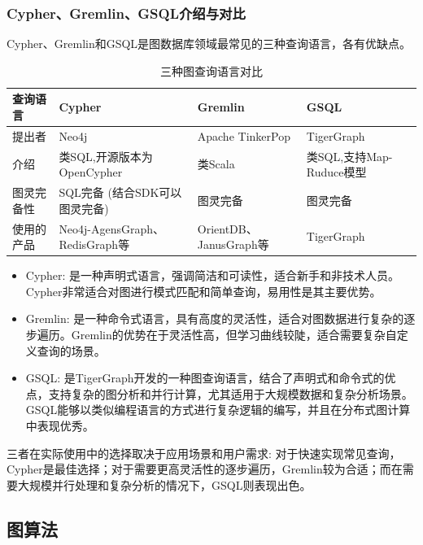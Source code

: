 \subsubsection*{Cypher、Gremlin、GSQL介绍与对比}
Cypher、Gremlin和GSQL是图数据库领域最常见的三种查询语言，各有优缺点。
\begin{table}[htbp]
	\centering
	\caption{三种图查询语言对比}
	\begin{tabularx}{\textwidth}{|X|X|X|X|}
		\hline
		查询语言  & Cypher                       & Gremlin              & GSQL                \\
		\hline
		提出者   & Neo4j                        & Apache TinkerPop     & TigerGraph          \\
		\hline
		介绍    & 类SQL,开源版本为OpenCypher         & 类Scala               & 类SQL,支持Map-Ruduce模型 \\
		\hline
		图灵完备性 & SQL完备 (结合SDK可以图灵完备)          & 图灵完备                 & 图灵完备                \\
		\hline
		使用的产品 & Neo4j-AgensGraph、RedisGraph等 & OrientDB、JanusGraph等 & TigerGraph          \\
		\hline
	\end{tabularx}%
	\label{tab:addlabel}%
\end{table}%
\begin{itemize}
	\item Cypher: 是一种声明式语言，强调简洁和可读性，适合新手和非技术人员。Cypher非常适合对图进行模式匹配和简单查询，易用性是其主要优势。
 	\item Gremlin: 是一种命令式语言，具有高度的灵活性，适合对图数据进行复杂的逐步遍历。Gremlin的优势在于灵活性高，但学习曲线较陡，适合需要复杂自定义查询的场景。
 	\item GSQL: 是TigerGraph开发的一种图查询语言，结合了声明式和命令式的优点，支持复杂的图分析和并行计算，尤其适用于大规模数据和复杂分析场景。GSQL能够以类似编程语言的方式进行复杂逻辑的编写，并且在分布式图计算中表现优秀。
\end{itemize}
三者在实际使用中的选择取决于应用场景和用户需求: 对于快速实现常见查询，Cypher是最佳选择；对于需要更高灵活性的逐步遍历，Gremlin较为合适；而在需要大规模并行处理和复杂分析的情况下，GSQL则表现出色。


\subsection{图算法}

